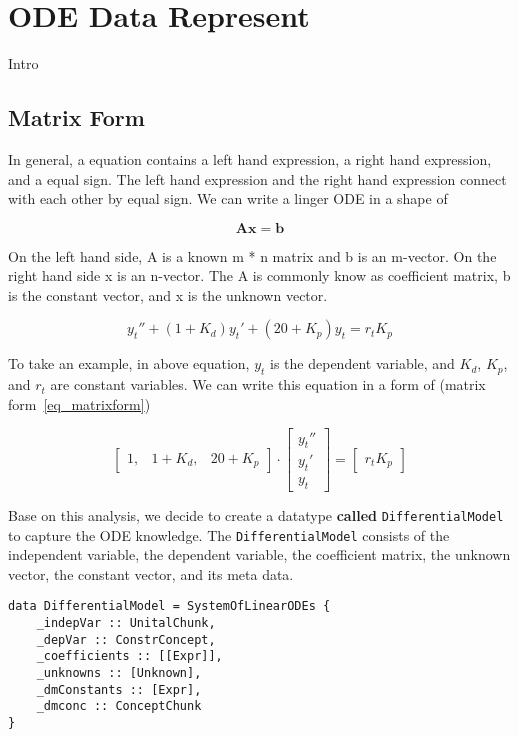 \chapter{ODE Data Represent}
Intro

\section{Matrix Form}
In general, a equation contains a left hand expression, a right hand expression, and a equal sign. The left hand expression and the right hand expression connect with each other by equal sign. We can write a linger ODE in a shape of

\begin{equation} \label{eq_matrixform}
	\boldsymbol{Ax} = \boldsymbol{b}
\end{equation}

On the left hand side, A is a known m * n matrix and b is an m-vector. On the right hand side x is an n-vector. The A is commonly know as coefficient matrix, b is the constant vector, and x is the unknown vector.

\begin{equation} \label{eq_odeexmaple}
	y_t'' + (1 + K_d)y_t' + (20 + K_p)y_t = r_t K_p
\end{equation}

To take an example, in above equation, $y_t$ is the dependent variable, and 
$K_d$, $K_p$, and $r_t$ are constant variables. We can write this equation in a form of (matrix form~\ref{eq_matrixform})

\[
\begin{bmatrix}
    1, & 1 + K_{d}, & 20 + K_{p}
\end{bmatrix}
\cdot
\begin{bmatrix}
    y_{t}''  \\
    y_{t}'   \\
    y_{t}  
\end{bmatrix}
=
\begin{bmatrix}
    r_{t} K_{p} 
\end{bmatrix}
\]

Base on this analysis, we decide to create a datatype \textbf{called} \verb|DifferentialModel| to capture the ODE knowledge. The \verb|DifferentialModel| consists of the independent variable, the dependent variable, the coefficient matrix, the unknown vector, the constant vector, and its meta data.

\begin{lstlisting}[language=HaskellUlisses]
data DifferentialModel = SystemOfLinearODEs {
	_indepVar :: UnitalChunk,
	_depVar :: ConstrConcept,
	_coefficients :: [[Expr]],
	_unknowns :: [Unknown],
	_dmConstants :: [Expr],
	_dmconc :: ConceptChunk
}
\end{lstlisting}

